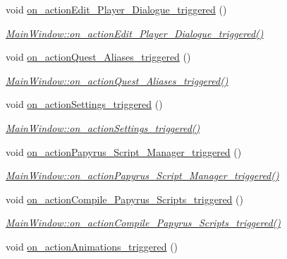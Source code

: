 \begin{DoxyCompactItemize}
void \hyperlink{class_main_window_a09845ae686236e352e5933f1f701cbf0}{on\+\_\+action\+Edit\+\_\+\+Player\+\_\+\+Dialogue\+\_\+triggered} ()
\begin{DoxyCompactList}\small\item\em \hyperlink{class_main_window_a09845ae686236e352e5933f1f701cbf0}{Main\+Window\+::on\+\_\+action\+Edit\+\_\+\+Player\+\_\+\+Dialogue\+\_\+triggered()} \end{DoxyCompactList}\item 
void \hyperlink{class_main_window_a4f3cdc71383485c5d1f2b5db0f0e6bc2}{on\+\_\+action\+Quest\+\_\+\+Aliases\+\_\+triggered} ()
\begin{DoxyCompactList}\small\item\em \hyperlink{class_main_window_a4f3cdc71383485c5d1f2b5db0f0e6bc2}{Main\+Window\+::on\+\_\+action\+Quest\+\_\+\+Aliases\+\_\+triggered()} \end{DoxyCompactList}\item 
void \hyperlink{class_main_window_aa85aa1670a3d30f7987e4750aebe8a88}{on\+\_\+action\+Settings\+\_\+triggered} ()
\begin{DoxyCompactList}\small\item\em \hyperlink{class_main_window_aa85aa1670a3d30f7987e4750aebe8a88}{Main\+Window\+::on\+\_\+action\+Settings\+\_\+triggered()} \end{DoxyCompactList}\item 
void \hyperlink{class_main_window_aff1e2e1ceb8705f368c624cec0407c12}{on\+\_\+action\+Papyrus\+\_\+\+Script\+\_\+\+Manager\+\_\+triggered} ()
\begin{DoxyCompactList}\small\item\em \hyperlink{class_main_window_aff1e2e1ceb8705f368c624cec0407c12}{Main\+Window\+::on\+\_\+action\+Papyrus\+\_\+\+Script\+\_\+\+Manager\+\_\+triggered()} \end{DoxyCompactList}\item 
void \hyperlink{class_main_window_aa087e7b86de7eb48d08a7bd160fd70be}{on\+\_\+action\+Compile\+\_\+\+Papyrus\+\_\+\+Scripts\+\_\+triggered} ()
\begin{DoxyCompactList}\small\item\em \hyperlink{class_main_window_aa087e7b86de7eb48d08a7bd160fd70be}{Main\+Window\+::on\+\_\+action\+Compile\+\_\+\+Papyrus\+\_\+\+Scripts\+\_\+triggered()} \end{DoxyCompactList}\item 
void \hyperlink{class_main_window_aab19d695ce2f45f385dae020164106de}{on\+\_\+action\+Animations\+\_\+triggered} ()

\end{DoxyCompactItemize}
